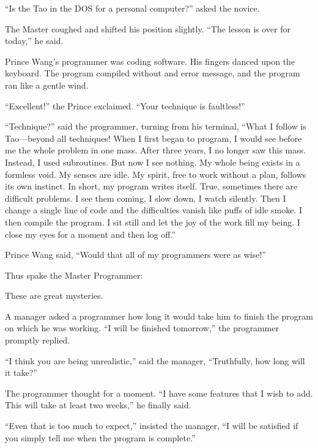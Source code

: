 ``Is the Tao in the DOS for a personal computer?'' asked the novice.

The Master coughed and shifted his position slightly. ``The lesson is over for today,'' he said.

Prince Wang's programmer was coding software. His fingers danced upon the keyboard. The program compiled without and error message, and the program ran like a gentle wind.

``Excellent!'' the Prince exclaimed. ``Your technique is faultless!''

``Technique?'' said the programmer, turning from his terminal, ``What I follow is Tao---beyond all techniques! When I first began to program, I would see before me the whole problem in one mass. After three years, I no longer saw this mass. Instead, I used subroutines. But now I see nothing. My whole being exists in a formless void. My senses are idle. My spirit, free to work without a plan, follows its own instinct. In short, my program writes itself. True, sometimes there are difficult problems. I see them coming, I slow down, I watch silently. Then I change a single line of code and the difficulties vanish like puffs of idle smoke. I then compile the program. I sit still and let the joy of the work fill my being. I close my eyes for a moment and then log off.''

Prince Wang said, ``Would that all of my programmers were as wise!''

Thus spake the Master Programmer:


These are great mysteries.

A manager asked a programmer how long it would take him to finish the program on which he was working. ``I will be finished tomorrow,'' the programmer promptly replied.

``I think you are being unrealistic,'' said the manager, ``Truthfully, how long will it take?''

The programmer thought for a moment. ``I have some features that I wish to add. This will take at least two weeks,'' he finally said.

``Even that is too much to expect,'' insisted the manager, ``I will be satisfied if you simply tell me when the program is complete.''

